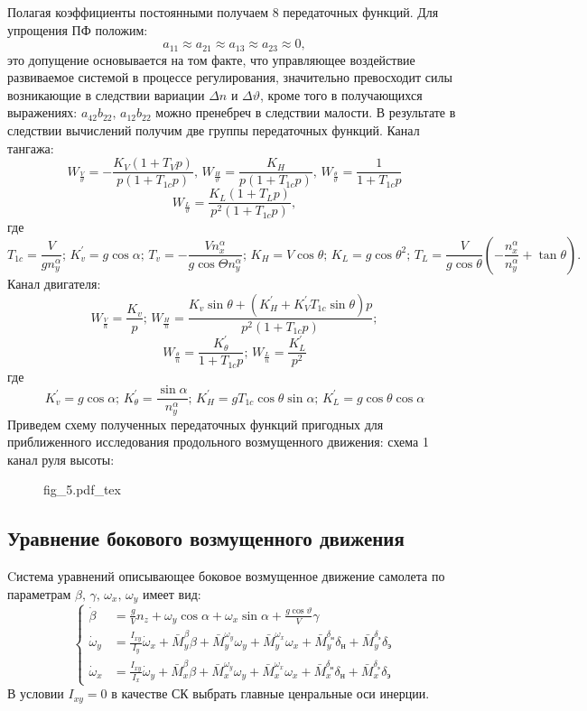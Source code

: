 \documentclass{article}
\begin{document}
Полагая коэффициенты постоянными получаем 8 передаточных функций. Для упрощения ПФ положим:
\[
    a_{11} \approx a_{21} \approx a_{13} \approx a_{23} \approx 0,  
\]
это допущение основывается на том факте, что управляющее воздействие развиваемое системой в процессе регулирования, значительно превосходит силы возникающие в следствии вариации $\Delta n$ и $\Delta \vartheta$, кроме того в получающихся выражениях:
$a_{42} b_{22}, \, a_{12} b_{22}$ можно пренебреч в следствии малости.
В результате в следствии вычислений получим две группы передаточных функций.
Канал тангажа:
\[
	W_{\frac{V}{\vartheta}} = -\frac{K_V(1+T_Vp)}{p(1+T_{1c}p)}, \, W_{\frac{H}{\vartheta}} = \frac{K_H}{p(1+T_{1c}p)}, \, W_{\frac{\theta}{\vartheta}} = \frac{1}{1+T_{1c}p}
\]
\[
	W_{\frac{L}{\vartheta}} = \frac{K_L(1+T_Lp)}{p^2(1+T_{1c}p)},
\]
где
\[
	T_{1c} = \frac{V}{g n_y^\alpha}; \, K_v^{'} = g\cos{\alpha}; \, T_v = -\frac{V n_x^\alpha}{g \cos{\Theta} n_y^\alpha};\, K_H = V \cos{\theta}; \, K_L = g \cos{\theta}^2 ;\, T_L= \frac{V}{g \cos{\theta}} (- \frac{n_x^\alpha}{n_y^\alpha} + \tan{\theta}).
\]
Канал двигателя:
\[
	W_{\frac{V}{n}} = \frac{K_v}{p};\, W_{\frac{H}{n}} = \frac{K_v \sin{\theta} + (K_H^{'} + K_V^{'} T_{1c} \sin{\theta})p}{p^2(1+T_{1c}p)};
\]
\[
	W_{\frac{\theta}{n}} = \frac{K_\theta^{'}}{1+T_{1c}p}; \, W_{\frac{L}{n}} = \frac{K_L^{'}}{p^2} 
\]
где
\[
	K_v^{'} = g\cos{\alpha}; \, K_\theta^{'} = \frac{\sin{\alpha}}{n_y^\alpha}; \, K_H^{'} = gT_{1c} \cos{\theta}\sin{\alpha};\, K_L^{'} = g\cos{\theta} \cos{\alpha}
\]
Приведем схему полученных передаточных функций пригодных для приближенного исследования продольного возмущенного движения:
схема 1 канал руля высоты:
\begin{figure}[ht]
	{fig_5.pdf_tex}
\end{figure}

\subsection{Уравнение бокового возмущенного движения}
Cистема уравнений описывающее боковое возмущенное движение самолета по параметрам $\beta, \, \gamma, \, \omega_x, \, \omega_y$ имеет вид:
\begin{equation}
	\begin{cases}
		\dot{\beta} &= \frac{g}{V} n_z + \omega_y \cos{\alpha} + \omega_x \sin{\alpha} + \frac{g\cos{\vartheta}}{V} \gamma                                                                                              \\
        \dot{\omega}_y&= \frac{I_{xy}}{I_y} \dot{\omega}_x + \bar{M}_y^\beta \beta + \bar{M}_y^{\omega_y} \omega_y + \bar{M}_y^{\omega_x} \omega_x + \bar{M}_y^{\delta_\text{н}} \delta_\text{н} + \bar{M}_y^{\delta_\text{э}} \delta_\text{э} \\
        \dot{\omega}_x&= \frac{I_{xy}}{I_x} \dot{\omega}_y + \bar{M}_x^\beta \beta + \bar{M}_x^{\omega_y} \omega_y + \bar{M}_x^{\omega_x} \omega_x + \bar{M}_x^{\delta_\text{н}} \delta_\text{н} + \bar{M}_x^{\delta_\text{э}} \delta_\text{э} 
	\end{cases}
\end{equation}
В условии $I_{xy} = 0$ в качестве СК выбрать главные ценральные оси инерции.
\end{document}

